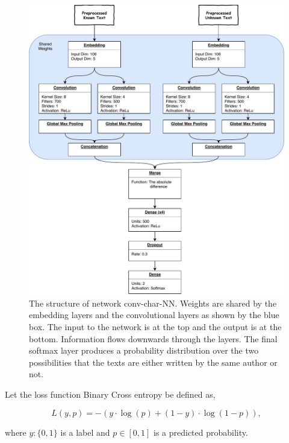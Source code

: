 \begin{figure}
    \centering
    \includegraphics[width=\textwidth]{./pictures/experiments/conv_char_nn/model}
    \caption{The structure of network \gls{conv-char-NN}. Weights are
        shared by the embedding layers and the convolutional layers as shown by
        the blue box. The input to the network is at the top and the output is
        at the bottom. Information flows downwards through the layers. The final
        softmax layer produces a probability distribution over the two
        possibilities that the texts are either written by the same author or
        not.}
    \label{fig:conv-char-NN}
\end{figure}

\begin{lemma}

    Let the loss function Binary Cross entropy be defined as,

    \begin{equation}\label{eq:binary_ce}
        L(y, p) = -(y \cdot \log(p) + (1- y)\cdot\log(1 - p)),
    \end{equation}

    where $y : \{0,1\}$ is a label and $p \in [0,1]$ is a predicted probability.

\end{lemma}

